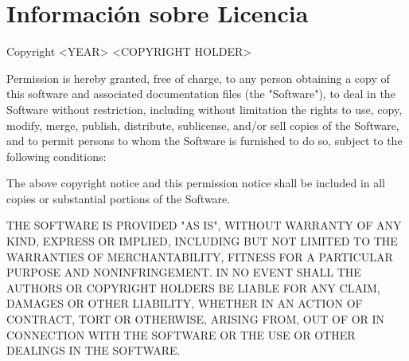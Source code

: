 

\chapter{Información sobre Licencia}
\thispagestyle{chapterpage}

Copyright <YEAR> <COPYRIGHT HOLDER>

Permission is hereby granted, free of charge, to any person obtaining a copy of this software and associated documentation files 
(the "Software"), to deal in the Software without restriction, including without limitation the rights to use, copy, modify, 
merge, publish, distribute, sublicense, and/or sell copies of the Software, and to permit persons to whom the Software is furnished 
to do so, subject to the following conditions: \medskip

The above copyright notice and this permission notice shall be included in all copies or substantial portions of the Software.

THE SOFTWARE IS PROVIDED "AS IS", WITHOUT WARRANTY OF ANY KIND, EXPRESS OR IMPLIED, INCLUDING BUT NOT LIMITED TO THE WARRANTIES 
OF MERCHANTABILITY, FITNESS FOR A PARTICULAR PURPOSE AND NONINFRINGEMENT. IN NO EVENT SHALL THE AUTHORS OR COPYRIGHT HOLDERS 
BE LIABLE FOR ANY CLAIM, DAMAGES OR OTHER LIABILITY, WHETHER IN AN ACTION OF CONTRACT, TORT OR OTHERWISE, ARISING FROM, 
OUT OF OR IN CONNECTION WITH THE SOFTWARE OR THE USE OR OTHER DEALINGS IN THE SOFTWARE.